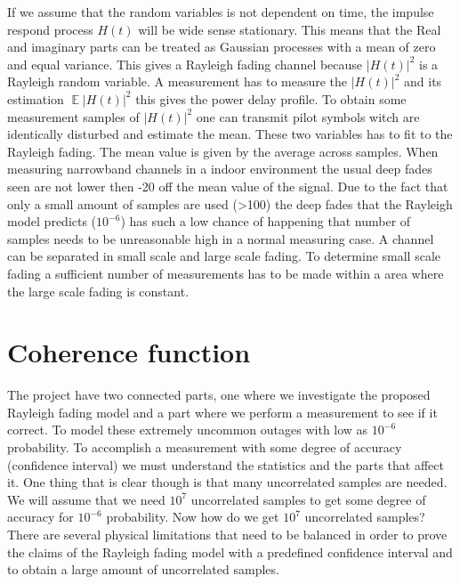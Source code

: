 If we assume that the random variables is not dependent on time, the impulse respond process $H(t)$ will be wide sense stationary. This means that the Real and imaginary parts can be treated as Gaussian processes with a mean of zero and equal variance. This gives a Rayleigh fading channel because $ \left | H(t) \right |^2 $ is a Rayleigh random variable.
A measurement has to measure the $ \left | H(t) \right |^2 $ and its estimation $ \mathop{\mathbb{E}}\left | H(t) \right |^2 $ this gives the power delay profile. To obtain some measurement samples of $ \left | H(t) \right |^2 $ one can transmit pilot symbols witch are identically disturbed and estimate the mean.\citep{MeasurementComplexRay}
These two variables has to fit to the Rayleigh fading. The mean value is given by the average across samples.
When measuring narrowband channels in a indoor environment the usual deep fades seen are not lower then -20 off the mean value of the signal. Due to the fact that only a small amount of samples are used (>100) the deep fades that the Rayleigh model predicts ($10^{-6}$) has such a low chance of happening that number of samples needs to be unreasonable high in a normal measuring case.
A  channel can be separated in  small scale and large scale fading. To determine small scale fading a sufficient number of measurements has to be made within a area where the large scale fading is constant.



\section{Coherence function}
The project have two connected parts, one where we investigate the proposed Rayleigh fading model and a part where we perform a measurement to see if it correct.  To model these extremely uncommon outages with low as $10^{-6}$ probability. To accomplish a measurement with some degree of accuracy (confidence interval) we must understand the statistics and the parts that affect it. One thing that is clear though is that many uncorrelated samples are needed. We will assume that we need $10^7$ uncorrelated samples to get some degree of accuracy for $10^{-6}$ probability. Now how do we get $10^7$ uncorrelated samples?
There are several physical limitations that need to be balanced  in order to prove the claims of the Rayleigh fading model with a predefined confidence interval and to obtain a large amount of uncorrelated samples.

